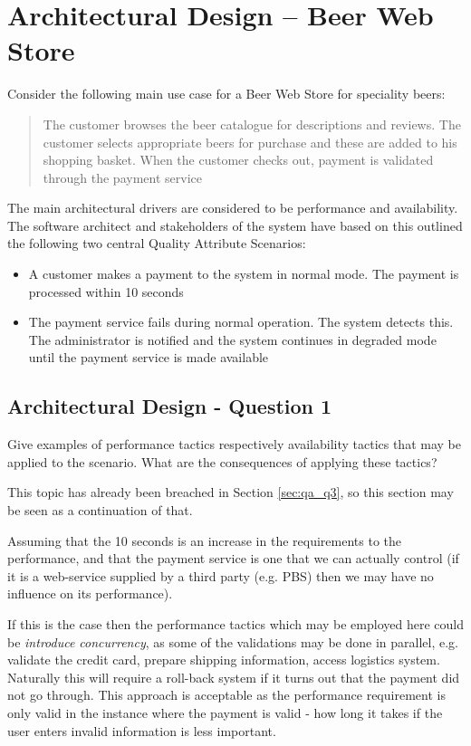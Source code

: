 \section{Architectural Design -- Beer Web Store}
Consider the following main use case for a Beer Web Store for speciality
beers:
\begin{quote}
  The customer browses the beer catalogue for descriptions and
  reviews. The customer selects appropriate beers for purchase and
  these are added to his shopping basket. When the customer checks
  out, payment is validated through the payment service
\end{quote}
The main architectural drivers are considered to be performance and
availability. The software architect and stakeholders of the system
have based on this outlined the following two central Quality
Attribute Scenarios:
\begin{itemize}
  \item A customer makes a payment to the system in normal mode. The
  payment is processed within 10 seconds
  \item The payment service fails during normal operation. The system
  detects this. The administrator is notified and the system continues
  in degraded mode until the payment service is made available
\end{itemize}

\subsection{Architectural Design - Question 1}

\begin{question}
Give examples of performance tactics respectively availability
tactics that may be applied to the scenario. What are the consequences
of applying these tactics?
\end{question}

This topic has already been breached in Section \ref{sec:qa_q3}, so this section may be seen as a continuation of that.

Assuming that the 10 seconds is an increase in the requirements to the performance, and that the payment service is one that we can actually control (if it is a web-service supplied by a third party (e.g. PBS) then we may have no influence on its performance). 

If this is the case then the performance tactics which may be employed here could be \emph{introduce concurrency}, as some of the validations may be done in parallel, e.g. validate the credit card, prepare shipping information, access logistics system. Naturally this will require a roll-back system if it turns out that the payment did not go through. This approach is acceptable as the performance requirement is only valid in the instance where the payment is valid - how long it takes if the user enters invalid information is less important. 

